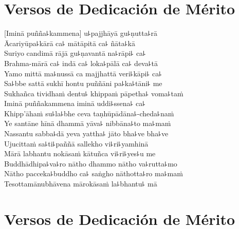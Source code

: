 \chapter*[Compartir Mérito]{Versos de Dedicación de Mérito}

\delegateSetUseNext

\begin{leader}
\end{leader}


[Iminā puñña꜕kammena] u꜕pajjhāyā gu꜕ṇutta꜕rā\\
Ācariyūpa꜕kārā ca꜕ mātāpitā ca꜕ ñāta꜕kā\\
Suriyo candimā rājā gu꜕ṇavantā na꜕rāpi꜕ ca꜕\\
Brahma-mārā ca꜕ indā ca꜕ loka꜕pālā ca꜕ deva꜕tā\\
Yamo mittā ma꜕nussā ca majjhattā veri꜕kāpi꜕ ca꜕\\
Sa꜕bbe sattā sukhī hontu puññāni pa꜕ka꜕tāni꜕ me\\
Sukhañca tividhaṁ dentu꜕ khippaṁ pāpetha꜕ voma꜕taṁ\\
Iminā puññakammena iminā uddi꜕ssena꜕ ca꜕\\
Khipp'āhaṁ su꜕la꜕bhe ceva taṇhūpādāna꜕-cheda꜕naṁ\\
Ye santāne hīnā dhammā yāva꜕ nibbāna꜕to ma꜕maṁ\\
Nassantu sabba꜕dā yeva yattha꜕ jāto bha꜕ve bha꜕ve\\
Ujucittaṁ sa꜕ti꜕paññā sallekho vi꜕ri꜕yamhinā\\
Mārā labhantu nokāsaṁ kātuñca vi꜕ri꜕yes꜕u me\\
Buddhādhipa꜕va꜕ro nātho dhammo nātho va꜕rutta꜕mo\\
Nātho pacceka꜕buddho ca꜕ saṅgho nāthotta꜕ro ma꜕maṁ\\
Tesottamānubhāvena mārokāsaṁ la꜕bhantu꜕ mā

\chapter[Compartir Mérito]{Versos de Dedicación de Mérito}

\enlargethispage{2\baselineskip}

\begin{leader}
\end{leader}


